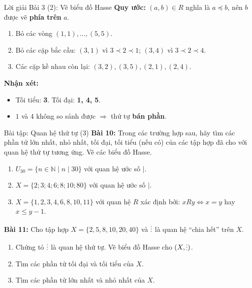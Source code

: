 \documentclass[12pt,a4paper]{article}
\newcommand{\chiahet}{\mathrel{\raisebox{-0.15ex}{\scalebox{0.85}{$\vdots$}}}}
\begin{document}
\begin{baitap}{Lời giải Bài 3 (2): Vẽ biểu đồ Hasse}
\textbf{Quy ước:} $(a, b) \in R$ nghĩa là $a \preceq b$, nên $b$ được vẽ \textbf{phía trên} $a$.

\noindent
\begin{minipage}[c]{0.58\textwidth}
\begin{enumerate}
  \item Bỏ các vòng $(1, 1), \dots, (5, 5)$.
  \item Bỏ các cặp bắc cầu: $(3, 1)$ vì $3 \prec 2 \prec 1$; $(3, 4)$ vì $3 \prec 2 \prec 4$.
  \item Các cặp kề nhau còn lại: $(3, 2), (3, 5), (2, 1), (2, 4)$.
\end{enumerate}
\textbf{Nhận xét:}
\begin{itemize}
  \item Tối tiểu: \textbf{3}. \qquad Tối đại: \textbf{1, 4, 5}.
  \item $1$ và $4$ không so sánh được $\Rightarrow$ thứ tự \textbf{bán phần}.
\end{itemize}
\end{minipage}
\hfill
\begin{minipage}[c]{0.38\textwidth}
\centering
{}
\end{minipage}
\end{baitap}

\begin{baitap}{Bài tập: Quan hệ thứ tự (3)}
\textbf{Bài 10:} Trong các trường hợp sau, hãy tìm các phần tử lớn nhất, nhỏ nhất, tối đại, tối tiểu (nếu có) của các tập hợp đã cho với quan hệ thứ tự tương ứng. Vẽ các biểu đồ Hasse.
\begin{enumerate}[label=\alph*)]
  \item $U_{30} = \{n \in \mathbb{N} \mid n \mid 30\}$ với quan hệ ước số $\mid$.
  \item $X = \{2; 3; 4; 6; 8; 10; 80\}$ với quan hệ ước số $\mid$.
  \item $X = \{1, 2, 3, 4, 6, 8, 10, 11\}$ với quan hệ $R$ xác định bởi: $xRy \iff x = y$ hay $x \le y - 1$.
\end{enumerate}

\textbf{Bài 11:} Cho tập hợp $X = \{2, 5, 8, 10, 20, 40\}$ và $\chiahet$ là quan hệ ``chia hết'' trên $X$.
\begin{enumerate}[label=\alph*)]
  \item Chứng tỏ $\chiahet$ là quan hệ thứ tự. Vẽ biểu đồ Hasse cho $(X, \chiahet)$.
  \item Tìm các phần tử tối đại và tối tiểu của $X$.
  \item Tìm các phần tử lớn nhất và nhỏ nhất của $X$.
\end{enumerate}
\end{baitap}
\end{document}
